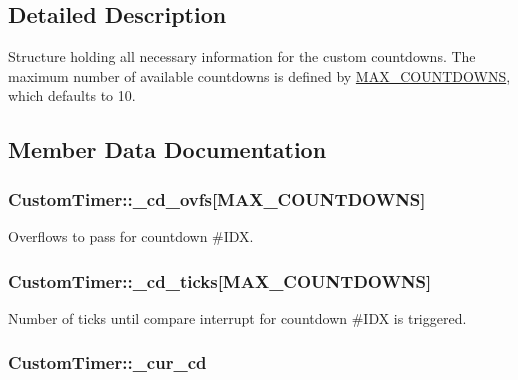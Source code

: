 \subsection{Detailed Description}
Structure holding all necessary information for the custom countdowns. The maximum number of available countdowns is defined by \hyperlink{customtimer_8h_aa856fcb7aee41aa2cdd570d9472fa2a5}{M\-A\-X\-\_\-\-C\-O\-U\-N\-T\-D\-O\-W\-N\-S}, which defaults to 10. 

\subsection{Member Data Documentation}
\hypertarget{structCustomTimer_aaedf2c0761d3a5c5f0fc620b8ff3066b}{
\subsubsection[{\-\_\-cd\-\_\-ovfs}]{ Custom\-Timer\-::\-\_\-cd\-\_\-ovfs\mbox{[}{\bf M\-A\-X\-\_\-\-C\-O\-U\-N\-T\-D\-O\-W\-N\-S}\mbox{]}}}\label{structCustomTimer_aaedf2c0761d3a5c5f0fc620b8ff3066b}
Overflows to pass for countdown \#\-I\-D\-X. \hypertarget{structCustomTimer_ae0684ad120aeca74d5b9346e214e8320}{
\subsubsection[{\-\_\-cd\-\_\-ticks}]{ Custom\-Timer\-::\-\_\-cd\-\_\-ticks\mbox{[}{\bf M\-A\-X\-\_\-\-C\-O\-U\-N\-T\-D\-O\-W\-N\-S}\mbox{]}}}\label{structCustomTimer_ae0684ad120aeca74d5b9346e214e8320}
Number of ticks until compare interrupt for countdown \#\-I\-D\-X is triggered. \hypertarget{structCustomTimer_a09300946b38b86d97fb0b156ef2cc4b2}{
\subsubsection[{\-\_\-cur\-\_\-cd}]{ Custom\-Timer\-::\-\_\-cur\-\_\-cd}}\label{structCustomTimer_a09300946b38b86d97fb0b156ef2cc4b2}
